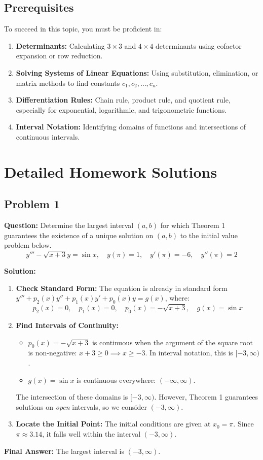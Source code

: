 \documentclass[11pt, a4paper]{article}
\theoremstyle{definition}
\theoremstyle{remark}
\begin{document}
\subsection{Prerequisites}
To succeed in this topic, you must be proficient in:
\begin{enumerate}
    \item \textbf{Determinants:} Calculating $3 \times 3$ and $4 \times 4$ determinants using cofactor expansion or row reduction.
    \item \textbf{Solving Systems of Linear Equations:} Using substitution, elimination, or matrix methods to find constants $c_1, c_2, \dots, c_n$.
    \item \textbf{Differentiation Rules:} Chain rule, product rule, and quotient rule, especially for exponential, logarithmic, and trigonometric functions.
    \item \textbf{Interval Notation:} Identifying domains of functions and intersections of continuous intervals.
\end{enumerate}

\newpage
\section{Detailed Homework Solutions}

\subsection{Problem 1}
\textbf{Question:} Determine the largest interval $(a,b)$ for which Theorem 1 guarantees the existence of a unique solution on $(a,b)$ to the initial value problem below.
\[ y''' - \sqrt{x+3}y = \sin x, \quad y(\pi) = 1, \quad y'(\pi) = -6, \quad y''(\pi) = 2 \]

\textbf{Solution:}
\begin{enumerate}
    \item \textbf{Check Standard Form:} The equation is already in standard form $y''' + p_2(x)y'' + p_1(x)y' + p_0(x)y = g(x)$, where:
    \[ p_2(x) = 0, \quad p_1(x) = 0, \quad p_0(x) = -\sqrt{x+3}, \quad g(x) = \sin x \]
    \item \textbf{Find Intervals of Continuity:}
    \begin{itemize}
        \item $p_0(x) = -\sqrt{x+3}$ is continuous when the argument of the square root is non-negative: $x + 3 \ge 0 \implies x \ge -3$. In interval notation, this is $[-3, \infty)$.
        \item $g(x) = \sin x$ is continuous everywhere: $(-\infty, \infty)$.
    \end{itemize}
    The intersection of these domains is $[-3, \infty)$. However, Theorem 1 guarantees solutions on \textit{open} intervals, so we consider $(-3, \infty)$.
    \item \textbf{Locate the Initial Point:} The initial conditions are given at $x_0 = \pi$. Since $\pi \approx 3.14$, it falls well within the interval $(-3, \infty)$.
\end{enumerate}
\textbf{Final Answer:} The largest interval is $(-3, \infty)$.
\end{document}

